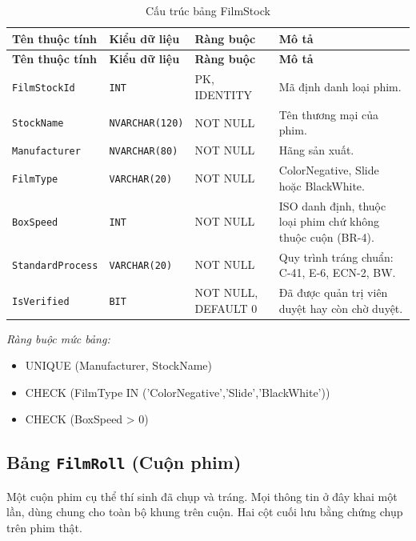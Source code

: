 \begin{longtable}{|L{4cm}|L{3.15cm}|L{2.4cm}|L{4.55cm}|}
\caption{Cấu trúc bảng FilmStock} \\
\hline
\textbf{Tên thuộc tính} & \textbf{Kiểu dữ liệu} & \textbf{Ràng buộc} & \textbf{Mô tả} \\ \hline
\endfirsthead
\hline
\textbf{Tên thuộc tính} & \textbf{Kiểu dữ liệu} & \textbf{Ràng buộc} & \textbf{Mô tả} \\ \hline
\endhead
\texttt{FilmStockId} & \texttt{INT} & PK, IDENTITY & Mã định danh loại phim. \\ \hline
\texttt{StockName} & \texttt{NVARCHAR(120)} & NOT NULL & Tên thương mại của phim. \\ \hline
\texttt{Manufacturer} & \texttt{NVARCHAR(80)} & NOT NULL & Hãng sản xuất. \\ \hline
\texttt{FilmType} & \texttt{VARCHAR(20)} & NOT NULL & ColorNegative, Slide hoặc BlackWhite. \\ \hline
\texttt{BoxSpeed} & \texttt{INT} & NOT NULL & ISO danh định, thuộc loại phim chứ không thuộc cuộn (BR-4). \\ \hline
\texttt{StandardProcess} & \texttt{VARCHAR(20)} & NOT NULL & Quy trình tráng chuẩn: C-41, E-6, ECN-2, BW. \\ \hline
\texttt{IsVerified} & \texttt{BIT} & NOT NULL, DEFAULT 0 & Đã được quản trị viên duyệt hay còn chờ duyệt. \\ \hline
\end{longtable}

\noindent\textit{Ràng buộc mức bảng:}

\begin{itemize}\raggedright
    \item UNIQUE (Manufacturer,\allowbreak{} StockName)
    \item CHECK (FilmType IN ('ColorNegative',\allowbreak{}'Slide',\allowbreak{}'BlackWhite'))
    \item CHECK (BoxSpeed > 0)
\end{itemize}

\subsection{Bảng \texttt{FilmRoll} (Cuộn phim)}

Một cuộn phim cụ thể thí sinh đã chụp và tráng. Mọi thông tin ở đây khai một lần, dùng chung cho toàn bộ khung trên cuộn. Hai cột cuối lưu bằng chứng chụp trên phim thật.

